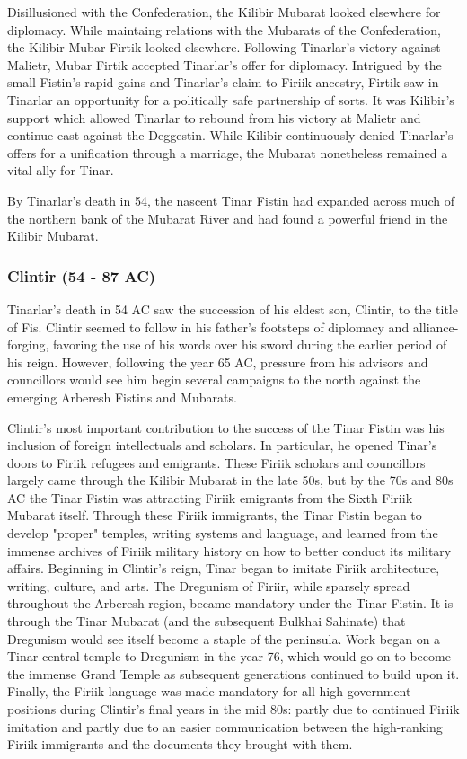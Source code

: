 			Disillusioned with the Confederation, the Kilibir Mubarat looked elsewhere for diplomacy. While maintaing relations with the Mubarats of the Confederation, the Kilibir Mubar Firtik looked elsewhere. Following Tinarlar's victory against Malietr, Mubar Firtik accepted Tinarlar's offer for diplomacy. Intrigued by the small Fistin's rapid gains and Tinarlar's claim to Firiik ancestry, Firtik saw in Tinarlar an opportunity for a politically safe partnership of sorts. It was Kilibir's support which allowed Tinarlar to rebound from his victory at Malietr and continue east against the Deggestin. While Kilibir continuously denied Tinarlar's offers for a unification through a marriage, the Mubarat nonetheless remained a vital ally for Tinar.
			
			By Tinarlar's death in 54, the nascent Tinar Fistin had expanded across much of the northern bank of the Mubarat River and had found a powerful friend in the Kilibir Mubarat.
		\subsubsection{Clintir (54 - 87 AC)}
			Tinarlar's death in 54 AC saw the succession of his eldest son, Clintir, to the title of Fis. Clintir seemed to follow in his father's footsteps of diplomacy and alliance-forging, favoring the use of his words over his sword during the earlier period of his reign. However, following the year 65 AC, pressure from his advisors and councillors would see him begin several campaigns to the north against the emerging Arberesh Fistins and Mubarats.
			
			Clintir's most important contribution to the success of the Tinar Fistin was his inclusion of foreign intellectuals and scholars. In particular, he opened Tinar's doors to Firiik refugees and emigrants. These Firiik scholars and councillors largely came through the Kilibir Mubarat in the late 50s, but by the 70s and 80s AC the Tinar Fistin was attracting Firiik emigrants from the Sixth Firiik Mubarat itself. Through these Firiik immigrants, the Tinar Fistin began to develop "proper" temples, writing systems and language, and learned from the immense archives of Firiik military history on how to better conduct its military affairs. Beginning in Clintir's reign, Tinar began to imitate Firiik architecture, writing, culture, and arts. The Dregunism of Firiir, while sparsely spread throughout the Arberesh region, became mandatory under the Tinar Fistin. It is through the Tinar Mubarat (and the subsequent Bulkhai Sahinate) that Dregunism would see itself become a staple of the peninsula. Work began on a Tinar central temple to Dregunism in the year 76, which would go on to become the immense Grand Temple as subsequent generations continued to build upon it. Finally, the Firiik language was made mandatory for all high-government positions during Clintir's final years in the mid 80s: partly due to continued Firiik imitation and partly due to an easier communication between the high-ranking Firiik immigrants and the documents they brought with them.
			
